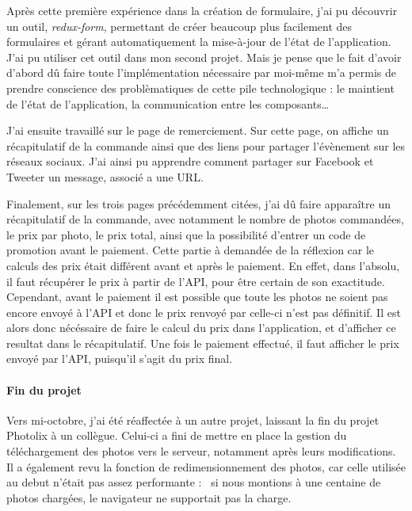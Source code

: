 \bigskip

Après cette première expérience dans la création de formulaire, j'ai pu
découvrir un outil, \emph{redux-form}, permettant de créer beaucoup plus
facilement des formulaires et gérant automatiquement la mise-à-jour de
l'état de l'application. J'ai pu utiliser cet outil dans mon second
projet. Mais je pense que le fait d'avoir d'abord dû faire toute
l'implémentation nécessaire par moi-même m'a permis de prendre
conscience des problèmatiques de cette pile technologique : le maintient
de l'état de l'application, la communication entre les
composants\ldots{}

\bigskip

J'ai ensuite travaillé sur le page de remerciement. Sur cette page, on
affiche un récapitulatif de la commande ainsi que des liens pour
partager l'évènement sur les réseaux sociaux. J'ai ainsi pu apprendre
comment partager sur Facebook et Tweeter un message, associé a une URL.

\bigskip

Finalement, sur les trois pages précédemment citées, j'ai dû faire
apparaître un récapitulatif de la commande, avec notamment le nombre de
photos commandées, le prix par photo, le prix total, ainsi que la
possibilité d'entrer un code de promotion avant le paiement. Cette
partie à demandée de la réflexion car le calculs des prix était
différent avant et après le paiement. En effet, dans l'absolu, il faut
récupérer le prix à partir de l'API, pour être certain de son
exactitude. Cependant, avant le paiement il est possible que toute les
photos ne soient pas encore envoyé à l'API et donc le prix renvoyé par
celle-ci n'est pas définitif. Il est alors donc nécéssaire de faire le
calcul du prix dans l'application, et d'afficher ce resultat dans le
récapitulatif. Une fois le paiement effectué, il faut afficher le prix
envoyé par l'API, puisqu'il s'agit du prix final.

\bigskip

\paragraph{Fin du projet}\label{fin-du-projet}

\bigskip

Vers mi-octobre, j'ai été réaffectée à un autre projet, laissant la fin
du projet Photolix à un collègue. Celui-ci a fini de mettre en place la
gestion du téléchargement des photos vers le serveur, notamment après
leurs modifications. Il a également revu la fonction de
redimensionnement des photos, car celle utilisée au debut n'était pas
assez performante : ~si nous montions à une centaine de photos chargées,
le navigateur ne supportait pas la charge.

